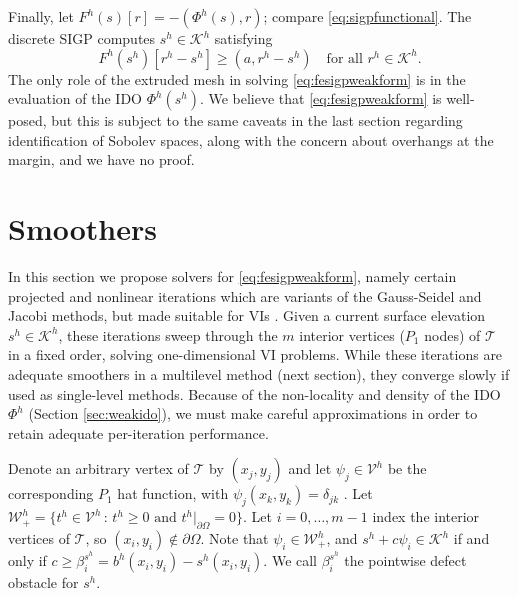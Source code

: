 \documentclass[letterpaper,final,12pt,reqno]{amsart}
\theoremstyle{claim}
\newcommand{\ip}[2]{\left(#1,#2\right)}
\numberwithin{equation}{section}
\numberwithin{figure}{section}
\numberwithin{table}{section}
\numberwithin{theorem}{section}
\begin{document}
Finally, let $F^h(s)[r] = - \ip{\Phi^h(s)}{r}$; compare \eqref{eq:sigpfunctional}.  The discrete SIGP computes $s^h \in \mathcal{K}^h$ satisfying
\begin{equation}
F^h(s^h)[r^h - s^h] \ge \ip{a}{r^h-s^h} \quad \text{for all } r^h \in \mathcal{K}^h. \label{eq:fesigpweakform}
\end{equation}
The only role of the extruded mesh in solving \eqref{eq:fesigpweakform} is in the evaluation of the IDO $\Phi^h(s^h)$.  We believe that \eqref{eq:fesigpweakform} is well-posed, but this is subject to the same caveats in the last section regarding identification of Sobolev spaces, along with the concern about overhangs at the margin, and we have no proof.


\section{Smoothers} \label{sec:smoothers}

In this section we propose solvers for \eqref{eq:fesigpweakform}, namely certain projected and nonlinear iterations which are variants of the Gauss-Seidel and Jacobi methods, but made suitable for VIs \cite{KinderlehrerStampacchia1980}.  Given a current surface elevation $s^h\in \mathcal{K}^h$, these iterations sweep through the $m$ interior vertices ($P_1$ nodes) of $\mathcal{T}$ in a fixed order, solving one-dimensional VI problems.  While these iterations are adequate smoothers in a multilevel method (next section), they converge slowly if used as single-level methods.  Because of the non-locality and density of the IDO $\Phi^h$ (Section \ref{sec:weakido}), we must make careful approximations in order to retain adequate per-iteration performance.

Denote an arbitrary vertex of $\mathcal{T}$ by $(x_j,y_j)$ and let $\psi_j \in \mathcal{V}^h$ be the corresponding $P_1$ hat function, with $\psi_j(x_k,y_k)=\delta_{jk}$ \cite{Elmanetal2014}.  Let $\mathcal{W}_+^h = \{t^h \in \mathcal{V}^h \,:\, t^h \ge 0 \text{ and } t^h|_{\partial\Omega} = 0\}$.  Let $i=0,\dots,m-1$ index the interior vertices of $\mathcal{T}$, so $(x_i,y_i) \notin \partial\Omega$.  Note that $\psi_i \in \mathcal{W}_+^h$, and $s^h + c \psi_i \in \mathcal{K}^h$ if and only if $c\ge \beta_i^{s^h} = b^h(x_i,y_i) - s^h(x_i,y_i)$.  We call $\beta_i^{s^h}$ the pointwise defect obstacle \cite{GraeserKornhuber2009} for $s^h$.
\end{document}

